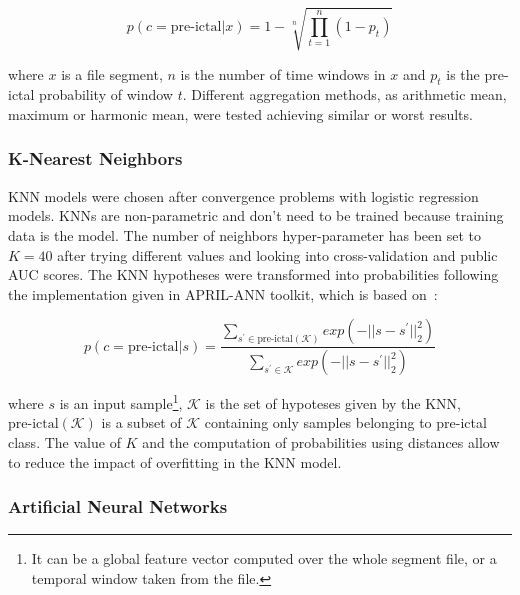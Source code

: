\documentclass[a4paper,english,twoside]{article}
\begin{document}
\begin{equation}
p(c=\text{pre-ictal} | x) = 1 - \sqrt[n]{\prod_{t=1}^n (1 - p_t)}
\label{eq:gmean}
\end{equation}

\noindent where $x$ is a file segment, $n$ is the number of time windows in $x$
and $p_t$ is the pre-ictal probability of window $t$. Different aggregation
methods, as arithmetic mean, maximum or harmonic mean, were tested achieving
similar or worst results.

\subsubsection{K-Nearest Neighbors}\label{k-nearest-neighbors}

KNN models were chosen after convergence problems with logistic regression
models. KNNs are non-parametric and don't need to be trained because training
data is the model. The number of neighbors hyper-parameter has been set to
$K=40$ after trying different values and looking into cross-validation and
public AUC scores. The KNN hypotheses were transformed into probabilities
following the implementation given in APRIL-ANN toolkit, which is based
on~\cite{2005:nips:hinton:NCA}:

\begin{equation}
p(c=\text{pre-ictal} | s) =
\displaystyle{\frac{\displaystyle{\sum_{ s^\prime \in \text{pre-ictal}(\mathcal{K}) } exp( -||s - s^\prime||^2_2 ) }}
{\displaystyle{\sum_{s^\prime \in \mathcal{K}} exp( -||s - s^\prime||^2_2 ) }}}
\end{equation}

\noindent where $s$ is an input sample\footnote{It can be a global feature
  vector computed over the whole segment file, or a temporal window taken from
  the file.}, $\mathcal{K}$ is the set of hypoteses given by the KNN,
$\text{pre-ictal}(\mathcal{K})$ is a subset of $\mathcal{K}$ containing only
samples belonging to pre-ictal class. The value of $K$ and the computation of
probabilities using distances allow to reduce the impact of overfitting in the
KNN model.

\subsubsection{Artificial Neural
  Networks}\label{artificial-neural-networks}
\end{document}
